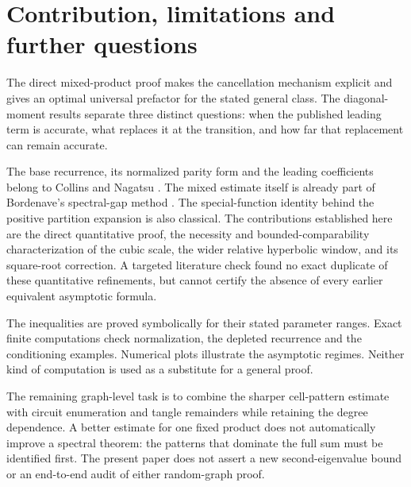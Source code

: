 \section{Contribution, limitations and further questions}

The direct mixed-product proof makes the cancellation mechanism explicit and gives an optimal universal prefactor for the stated general class. The diagonal-moment results separate three distinct questions: when the published leading term is accurate, what replaces it at the transition, and how far that replacement can remain accurate.

The base recurrence, its normalized parity form and the leading coefficients belong to Collins and Nagatsu \cite{CN}. The mixed estimate itself is already part of Bordenave's spectral-gap method \cite{Bordenave}. The special-function identity behind the positive partition expansion is also classical. The contributions established here are the direct quantitative proof, the necessity and bounded-comparability characterization of the cubic scale, the wider relative hyperbolic window, and its square-root correction. A targeted literature check found no exact duplicate of these quantitative refinements, but cannot certify the absence of every earlier equivalent asymptotic formula.

The inequalities are proved symbolically for their stated parameter ranges. Exact finite computations check normalization, the depleted recurrence and the conditioning examples. Numerical plots illustrate the asymptotic regimes. Neither kind of computation is used as a substitute for a general proof.

The remaining graph-level task is to combine the sharper cell-pattern estimate with circuit enumeration and tangle remainders while retaining the degree dependence. A better estimate for one fixed product does not automatically improve a spectral theorem: the patterns that dominate the full sum must be identified first. The present paper does not assert a new second-eigenvalue bound or an end-to-end audit of either random-graph proof.
